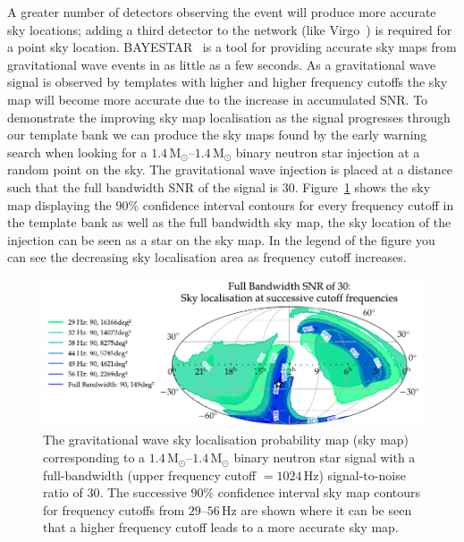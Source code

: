 A greater number of detectors observing the event will produce more accurate sky locations; adding a third detector to the network (like Virgo~\cite{aVirgo:2015}) is required for a point sky location. BAYESTAR~\cite{BAYESTAR:2016} is a tool for providing accurate sky maps from gravitational wave events in as little as a few seconds. As a gravitational wave signal is observed by templates with higher and higher frequency cutoffs the sky map will become more accurate due to the increase in accumulated SNR. To demonstrate the improving sky map localisation as the signal progresses through our template bank we can produce the sky maps found by the early warning search when looking for a $1.4 \, \text{M$_\odot$}\text{--}1.4 \, \text{M$_\odot$}$ binary neutron star injection at a random point on the sky. The gravitational wave injection is placed at a distance such that the full bandwidth SNR of the signal is $30$. Figure~\ref{6:fig:ew_30SNR_multiple} shows the sky map displaying the 90\% confidence interval contours for every frequency cutoff in the template bank as well as the full bandwidth sky map, the sky location of the injection can be seen as a star on the sky map. In the legend of the figure you can see the decreasing sky localisation area as frequency cutoff increases.
%
\begin{figure}
    \centering
    \includegraphics[width=\textwidth]{images/6_earlywarning/localisation/30SNR_multiple.pdf}
    \caption{The gravitational wave sky localisation probability map (sky map) corresponding to a $1.4 \, \text{M$_\odot$}\text{--}1.4 \, \text{M$_\odot$}$ binary neutron star signal with a full-bandwidth (upper frequency cutoff $= 1024 \, \text{Hz}$) signal-to-noise ratio of $30$. The successive $90\%$ confidence interval sky map contours for frequency cutoffs from $29\text{--}56 \, \text{Hz}$ are shown where it can be seen that a higher frequency cutoff leads to a more accurate sky map.}
    \label{6:fig:ew_30SNR_multiple}
\end{figure}
%
